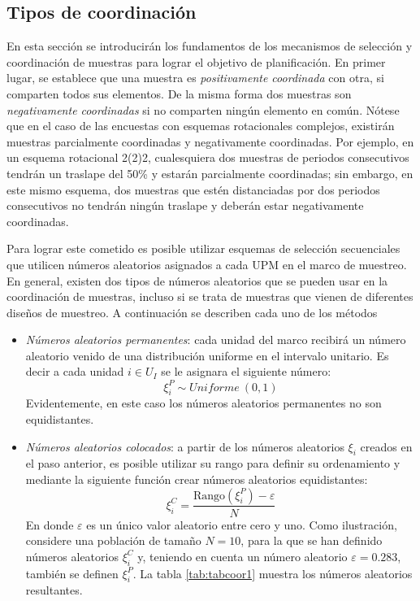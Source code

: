 \documentclass[
  12pt,
]{book}
\providecommand{\tightlist}{%
  \setlength{\itemsep}{0pt}\setlength{\parskip}{0pt}}
\begin{document}
\hypertarget{tipos-de-coordinaciuxf3n}{%
\subsection{Tipos de coordinación}\label{tipos-de-coordinaciuxf3n}}

En esta sección se introducirán los fundamentos de los mecanismos de selección y coordinación de muestras para lograr el objetivo de planificación. En primer lugar, se establece que una muestra es \emph{positivamente coordinada} con otra, si comparten todos sus elementos. De la misma forma dos muestras son \emph{negativamente coordinadas} si no comparten ningún elemento en común. Nótese que en el caso de las encuestas con esquemas rotacionales complejos, existirán muestras parcialmente coordinadas y negativamente coordinadas. Por ejemplo, en un esquema rotacional 2(2)2, cualesquiera dos muestras de periodos consecutivos tendrán un traslape del 50\% y estarán parcialmente coordinadas; sin embargo, en este mismo esquema, dos muestras que estén distanciadas por dos periodos consecutivos no tendrán ningún traslape y deberán estar negativamente coordinadas.

Para lograr este cometido es posible utilizar esquemas de selección secuenciales \citep{Gutierrez_2016} que utilicen números aleatorios asignados a cada UPM en el marco de muestreo. En general, existen dos tipos de números aleatorios que se pueden usar en la coordinación de muestras, incluso si se trata de muestras que vienen de diferentes diseños de muestreo. A continuación se describen cada uno de los métodos

\begin{itemize}
\tightlist
\item
  \emph{Números aleatorios permanentes}: cada unidad del marco recibirá un número aleatorio venido de una distribución uniforme en el intervalo unitario. Es decir a cada unidad \(i \in U_I\) se le asignara el siguiente número:
  \[
  \xi_i^P \sim Uniforme\ (0, 1)
  \]
  Evidentemente, en este caso los números aleatorios permanentes no son equidistantes.
\item
  \emph{Números aleatorios colocados}: a partir de los números aleatorios \(\xi_i\) creados en el paso anterior, es posible utilizar su rango para definir su ordenamiento y mediante la siguiente función crear números aleatorios equidistantes:
  \[
  \xi_i^C= \dfrac{\text{Rango}(\xi_i^P) - \varepsilon}{N}
  \]
  En donde \(\varepsilon\) es un único valor aleatorio entre cero y uno. Como ilustración, considere una población de tamaño \(N = 10\), para la que se han definido números aleatorios \(\xi_i^C\) y, teniendo en cuenta un número aleatorio \(\varepsilon = 0.283\), también se definen \(\xi_i^P\). La tabla \ref{tab:tabcoor1} muestra los números aleatorios resultantes.
\end{itemize}
\end{document}
